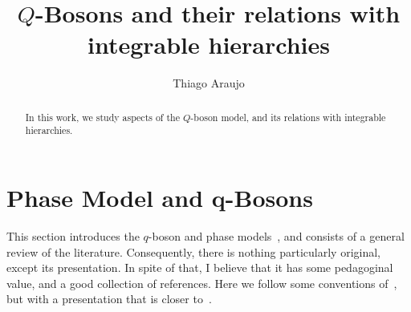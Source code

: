 \documentclass[a4paper,11pt]{amsart}
\begin{document}

\title[\(Q\)-Bosons and relations with integrable hierarchies]{\(Q\)-Bosons
and their relations with integrable hierarchies}

\author{Thiago Araujo}

\address{\noindent 
Instituto de Física Teórica, UNESP-Universidade Estadual Paulista,
R. Dr. Bento T. Ferraz 271, Bl. II, Sao Paulo 01140-070, SP, Brazil\\
\&
Instituto de Física, Universidade de S\~ao Paulo,
Rua do Matão Travessa 1371, 05508-090 São Paulo, SP. Brazil
}


\begin{abstract}
In this work, we study aspects of the \(Q\)-boson model, and 
its relations with integrable hierarchies. 
\end{abstract}

\maketitle

\setcounter{tocdepth}{2}
\tableofcontents

\section{Phase Model and q-Bosons}

This section introduces the \(q\)-boson and phase
models~\cite{Bogoliubov:1992, Bogoliubov:1997soj, Bogoliubov2005,
  Bogoliubov:1997soj, Tsilevich:2006}, and consists of a general
review of the literature. Consequently, there is nothing particularly
original, except its presentation.  In spite of that, I believe that
it has some pedagoginal value, and a good collection of references.
Here we follow some conventions of~\cite{Wheeler:2010vmq}, but with a
presentation that is closer to~\cite{Tsilevich:2006}.

\end{document}
